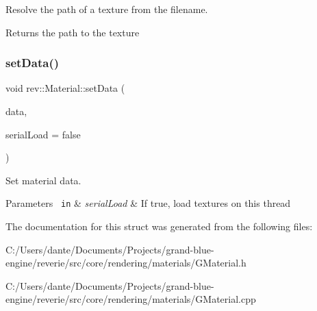 Resolve the path of a texture from the filename. 

\begin{DoxyReturn}{Returns}
the path to the texture 
\end{DoxyReturn}
\mbox{\label{classrev_1_1_material_ae519114a3c9b89d1ca4d363e9aae6132}} 
\subsubsection{\texorpdfstring{setData()}{setData()}}
{\footnotesize\ttfamily void rev\+::\+Material\+::set\+Data (\begin{DoxyParamCaption}\item[{const \mbox{\hyperlink{structrev_1_1_material_data}{Material\+Data}} \&}]{data,  }\item[{bool}]{serial\+Load = {\ttfamily false} }\end{DoxyParamCaption})}



Set material data. 


\begin{DoxyParams}[1]{Parameters}
\mbox{\texttt{ in}}  & {\em serial\+Load} & If true, load textures on this thread \\
\hline
\end{DoxyParams}


The documentation for this struct was generated from the following files\+:\begin{DoxyCompactItemize}
\item 
C\+:/\+Users/dante/\+Documents/\+Projects/grand-\/blue-\/engine/reverie/src/core/rendering/materials/G\+Material.\+h\item 
C\+:/\+Users/dante/\+Documents/\+Projects/grand-\/blue-\/engine/reverie/src/core/rendering/materials/G\+Material.\+cpp\end{DoxyCompactItemize}

